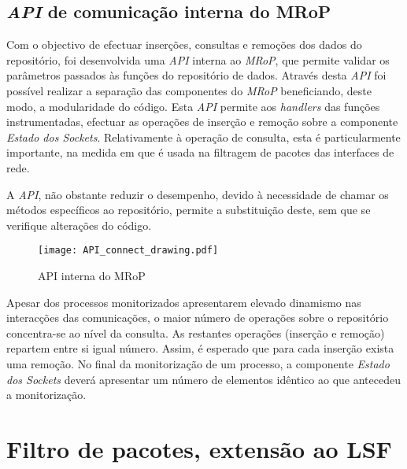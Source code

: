 \subsection{\textit{API} de comunicação interna do MRoP}
\label{sub:repo_api}

Com o objectivo de efectuar inserções, consultas e remoções dos dados do repositório, foi desenvolvida uma \textit{API} interna ao \textit{MRoP}, que permite validar os parâmetros passados às funções do repositório de dados.
Através desta \textit{API} foi possível realizar a separação das componentes do \textit{MRoP} beneficiando, deste modo, a modularidade do código.
Esta \textit{API} permite aos \textit{handlers} das funções instrumentadas, efectuar as operações de inserção e remoção sobre a componente \textit{Estado dos Sockets}.
Relativamente à operação de consulta, esta é particularmente importante, na medida em que é usada na filtragem de pacotes das interfaces de rede.

A \textit{API}, não obstante reduzir o desempenho, devido à necessidade de chamar os métodos específicos ao repositório, permite a substituição deste, sem que se verifique alterações do código.

\begin{figure}[!htbp]
\centering
\texttt{[image: API\_connect\_drawing.pdf]}
\caption{API interna do MRoP}
\label{fig:api_connect}
\end{figure}

 Apesar dos processos monitorizados apresentarem elevado dinamismo nas interacções das comunicações, o maior número de operações sobre o repositório concentra-se ao nível da consulta.
As restantes operações (inserção e remoção) repartem entre si igual número.
Assim, é esperado que para cada inserção exista uma remoção.
No final da monitorização de um processo, a componente \textit{Estado dos Sockets} deverá apresentar um número de elementos idêntico ao que antecedeu a monitorização.





\section{Filtro de pacotes, extensão ao LSF}

